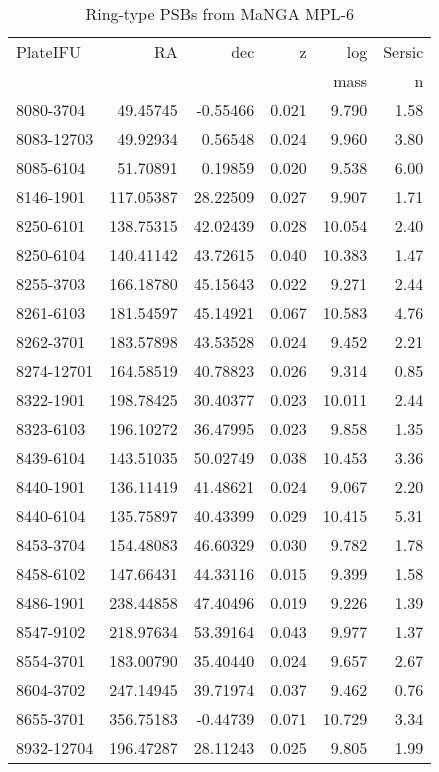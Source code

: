 \begin{table}
\caption{Ring-type PSBs from MaNGA MPL-6}
\label{tab:RPSBs}
\begin{tabular}{lrrrrr}
\hline
PlateIFU & RA & dec & z & log & Sersic \\
& & & & mass & n \\
\hline
8080-3704 & 49.45745 & -0.55466 & 0.021 & 9.790 & 1.58 \\
8083-12703 & 49.92934 & 0.56548 & 0.024 & 9.960 & 3.80 \\
8085-6104 & 51.70891 & 0.19859 & 0.020 & 9.538 & 6.00 \\
8146-1901 & 117.05387 & 28.22509 & 0.027 & 9.907 & 1.71 \\
8250-6101 & 138.75315 & 42.02439 & 0.028 & 10.054 & 2.40 \\
8250-6104 & 140.41142 & 43.72615 & 0.040 & 10.383 & 1.47 \\
8255-3703 & 166.18780 & 45.15643 & 0.022 & 9.271 & 2.44 \\
8261-6103 & 181.54597 & 45.14921 & 0.067 & 10.583 & 4.76 \\
8262-3701 & 183.57898 & 43.53528 & 0.024 & 9.452 & 2.21 \\
8274-12701 & 164.58519 & 40.78823 & 0.026 & 9.314 & 0.85 \\
8322-1901 & 198.78425 & 30.40377 & 0.023 & 10.011 & 2.44 \\
8323-6103 & 196.10272 & 36.47995 & 0.023 & 9.858 & 1.35 \\
8439-6104 & 143.51035 & 50.02749 & 0.038 & 10.453 & 3.36 \\
8440-1901 & 136.11419 & 41.48621 & 0.024 & 9.067 & 2.20 \\
8440-6104 & 135.75897 & 40.43399 & 0.029 & 10.415 & 5.31 \\
8453-3704 & 154.48083 & 46.60329 & 0.030 & 9.782 & 1.78 \\
8458-6102 & 147.66431 & 44.33116 & 0.015 & 9.399 & 1.58 \\
8486-1901 & 238.44858 & 47.40496 & 0.019 & 9.226 & 1.39 \\
8547-9102 & 218.97634 & 53.39164 & 0.043 & 9.977 & 1.37 \\
8554-3701 & 183.00790 & 35.40440 & 0.024 & 9.657 & 2.67 \\
8604-3702 & 247.14945 & 39.71974 & 0.037 & 9.462 & 0.76 \\
8655-3701 & 356.75183 & -0.44739 & 0.071 & 10.729 & 3.34 \\
8932-12704 & 196.47287 & 28.11243 & 0.025 & 9.805 & 1.99 \\

\end{tabular}
\end{table}
